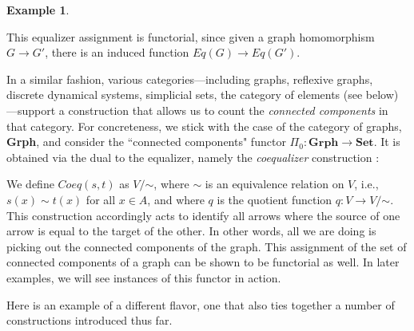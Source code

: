 \documentclass[11pt]{book}
\theoremstyle{definition}
\newtheorem{example}{Example}[section]
\theoremstyle{definition}
\theoremstyle{definition}
\theoremstyle{theorem}
\theoremstyle{definition}
\begin{document}
\begin{example}
	\begin{center} 
	\end{center} 
	This equalizer assignment is functorial, since given a graph homomorphism $G \rightarrow G'$, there is an induced function $Eq(G) \rightarrow Eq(G')$. \par 
	 In a similar fashion, various categories---including graphs, reflexive graphs, discrete dynamical systems, simplicial sets, the category of elements (see below)---support a construction that allows us to count the \textit{connected components} in that category. For concreteness, we stick with the case of the category of graphs, \textbf{Grph}, and consider the ``connected components"  functor $\Pi_0: \textbf{Grph} \rightarrow \textbf{Set}$. It is obtained via the dual to the equalizer, namely the \textit{coequalizer} construction :
	 \begin{center} 
	 \end{center}
	 We define $Coeq(s,t)$ as $V \big/$$\sim$, where $\sim$ is an equivalence relation on $V$, i.e., $s(x) \sim t(x)$ for all $x \in A$, and where $q$ is the quotient function $q: V \rightarrow V \big/$$\sim$. This construction accordingly acts to identify all arrows where the source of one arrow is equal to the target of the other. In other words, all we are doing is picking out the connected components of the graph. This assignment of the set of connected components of a graph can be shown to be functorial as well. In later examples, we will see instances of this functor in action. 
\end{example}
Here is an example of a different flavor, one that also ties together a number of constructions introduced thus far. 
\end{document}
